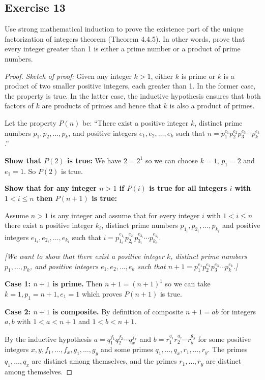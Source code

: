 \documentclass[14pt]{extarticle}
\begin{document}
\subsection{Exercise 13}
Use strong mathematical induction to prove the existence part of the unique factorization of integers theorem (Theorem 4.4.5). In other words, prove that every integer greater than 1 is either a prime number or a product of prime numbers.

\begin{proof}
{\it Sketch of proof:} Given any integer $k > 1$, either $k$ is prime or $k$ is a product of two smaller positive integers, each greater than 1. 
In the former case, the property is true. 
In the latter case, the inductive hypothesis ensures that both factors of $k$ are products of primes and hence that $k$ is also a product of primes.

Let the property $P(n)$ be: ``There exist a positive integer $k$, distinct prime numbers $p_1, p_2, \ldots, p_k$, and positive integers $e_1, e_2, \ldots, e_k$ such that $n = p_1^{e_1} p_2^{e_2} p_3^{e_3} \cdots p_k^{e_k}$.''

{\bf Show that $P(2)$ is true:} We have $2 = 2^{1}$ so we can choose $k = 1$, $p_1 = 2$ and $e_1 = 1$. So $P(2)$ is true.

{\bf Show that for any integer $n > 1$ if $P(i)$ is true for all integers $i$ with $1 < i \leq n$ then $P(n+1)$ is true:}

Assume $n > 1$ is any integer and assume that for every integer $i$ with $1 < i \leq n$ there exist a positive integer $k_i$, distinct prime numbers $p_{1_i}, p_{2_i}, \ldots, p_{k_i}$ and positive integers $e_{1_i}, e_{2_i}, \ldots, e_{k_i}$ such that $i = p_{1_i}^{e_{1_i}} p_{2_i}^{e_{2_i}} p_{3_i}^{e_{3_i}} \cdots p_{k_i}^{e_{k_i}}$.

{\it [We want to show that there exist a positive integer $k$, distinct prime numbers $p_1, \ldots, p_k$, and positive integers $e_1, e_2, \ldots, e_k$ such that $n+1 = p_1^{e_1} p_2^{e_2} p_3^{e_3} \cdots p_k^{e_k}$.]}

{\bf Case 1: $n+1$ is prime.} Then $n + 1 = (n+1)^1$ so we can take $k = 1, p_1 = n+1, e_1 = 1$ which proves $P(n+1)$ is true.

{\bf Case 2: $n+1$ is composite.} By definition of composite $n+1 = ab$ for integers $a,b$ with $1 < a < n+1$ and $1 < b < n+1$.

By the inductive hypothesis $a = q_1^{f_1} q_2^{f_2} \cdots q_x^{f_x}$ and $b = r_1^{g_1} r_2^{g_2} \cdots r_y^{g_y}$ for some positive integers $x, y, f_1, \ldots, f_x, g_1, \ldots, g_y$ and some primes $q_1, \ldots, q_x, r_1, \ldots, r_y$. The primes $q_1, \ldots, q_x$ are distinct among themselves, and the primes $r_1, \ldots, r_y$ are distinct among themselves.


\end{proof}
\end{document}
